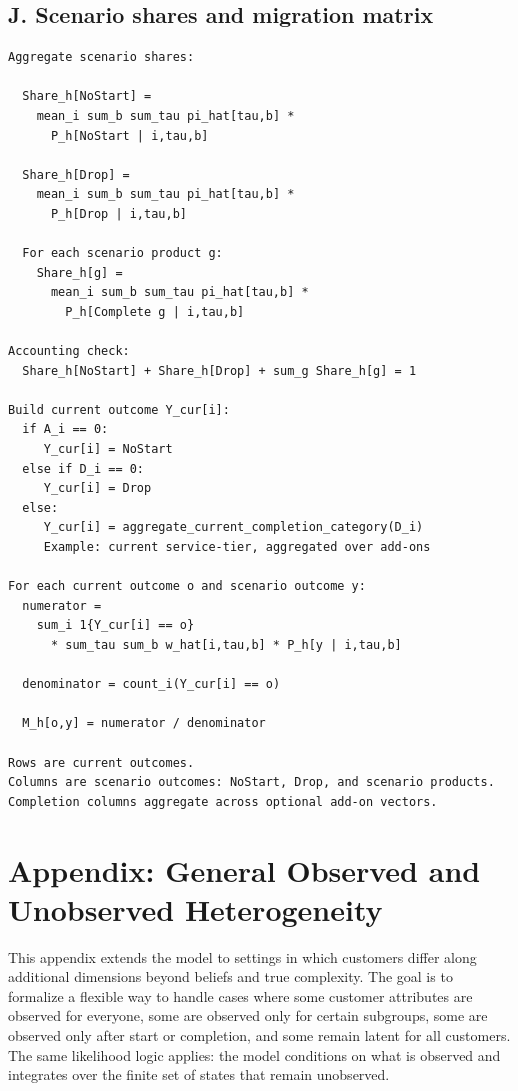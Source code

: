 \documentclass[11pt]{article}
\begin{document}
\newpage
\subsection*{J. Scenario shares and migration matrix}

\begin{Verbatim}[fontsize=\small, frame=single]
Aggregate scenario shares:

  Share_h[NoStart] =
    mean_i sum_b sum_tau pi_hat[tau,b] *
      P_h[NoStart | i,tau,b]

  Share_h[Drop] =
    mean_i sum_b sum_tau pi_hat[tau,b] *
      P_h[Drop | i,tau,b]

  For each scenario product g:
    Share_h[g] =
      mean_i sum_b sum_tau pi_hat[tau,b] *
        P_h[Complete g | i,tau,b]

Accounting check:
  Share_h[NoStart] + Share_h[Drop] + sum_g Share_h[g] = 1

Build current outcome Y_cur[i]:
  if A_i == 0:
     Y_cur[i] = NoStart
  else if D_i == 0:
     Y_cur[i] = Drop
  else:
     Y_cur[i] = aggregate_current_completion_category(D_i)
     Example: current service-tier, aggregated over add-ons

For each current outcome o and scenario outcome y:
  numerator =
    sum_i 1{Y_cur[i] == o}
      * sum_tau sum_b w_hat[i,tau,b] * P_h[y | i,tau,b]

  denominator = count_i(Y_cur[i] == o)

  M_h[o,y] = numerator / denominator

Rows are current outcomes.
Columns are scenario outcomes: NoStart, Drop, and scenario products.
Completion columns aggregate across optional add-on vectors.
\end{Verbatim}

\newpage
\appendix


\section{Appendix: General Observed and Unobserved Heterogeneity}

This appendix extends the model to settings in which customers differ along additional dimensions beyond beliefs and true complexity. The goal is to formalize a flexible way to handle cases where some customer attributes are observed for everyone, some are observed only for certain subgroups, some are observed only after start or completion, and some remain latent for all customers. The same likelihood logic applies: the model conditions on what is observed and integrates over the finite set of states that remain unobserved.
\end{document}
